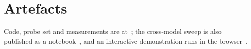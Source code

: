 \documentclass{article}
\begin{document}
\section*{Artefacts}

Code, probe set and measurements are at~\citep{thakur2026code}; the cross-model
sweep is also published as a notebook~\citep{thakur2026notebook}, and an
interactive demonstration runs in the browser~\citep{thakur2026demo}.



\end{document}
